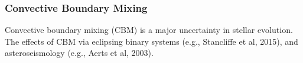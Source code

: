 {\color{purple}
\subsubsection{Convective Boundary Mixing}
}

Convective boundary mixing (CBM) is a major uncertainty in stellar evolution. The effects of CBM  via eclipsing binary systems (e.g., Stancliffe et al, 2015), and asteroseismology (e.g., Aerts et al, 2003).

